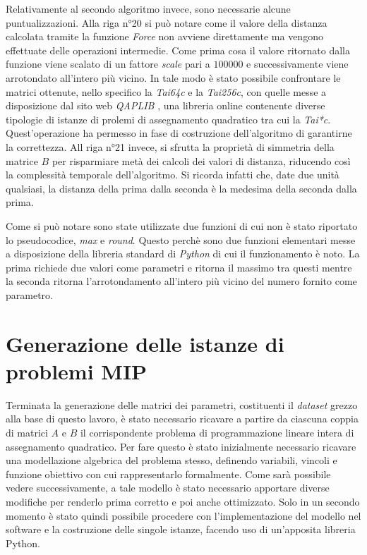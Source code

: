 Relativamente al secondo algoritmo invece, sono necessarie alcune puntualizzazioni. Alla riga n°20 si può notare come il valore della distanza 
calcolata tramite la funzione \textit{Force} non avviene direttamente ma vengono effettuate delle operazioni intermedie. Come prima cosa 
il valore ritornato dalla funzione viene scalato di un fattore \textit{scale} pari a $100000$ e successivamente viene arrotondato all'intero 
più vicino. In tale modo è stato possibile confrontare le matrici ottenute, nello specifico la \textit{Tai64c} e la \textit{Tai256c}, 
con quelle messe a disposizione dal sito web \textit{QAPLIB} \cite{QAPLIB}, una libreria online contenente diverse tipologie di istanze 
di prolemi di assegnamento quadratico tra cui la \textit{Tai*c}. Quest'operazione ha permesso in fase di costruzione dell'algoritmo di 
garantirne la correttezza. All riga n°21 invece, si sfrutta la proprietà di simmetria della matrice $B$ per risparmiare 
metà dei calcoli dei valori di distanza, riducendo così la complessità temporale dell'algoritmo. Si ricorda infatti che, date due unità 
qualsiasi, la distanza della prima dalla seconda è la medesima della seconda dalla prima.

Come si può notare sono state utilizzate due funzioni di cui non è stato riportato lo pseudocodice, \textit{max} e \textit{round}.
Questo perchè sono due funzioni elementari messe a disposizione della libreria standard di \textit{Python} \cite{python} di cui il 
funzionamento è noto. La prima richiede due valori come parametri e ritorna il massimo tra questi mentre la seconda ritorna 
l'arrotondamento all'intero più vicino del numero fornito come parametro.



\newpage
\section{Generazione delle istanze di problemi MIP}
Terminata la generazione delle matrici dei parametri, costituenti il \textit{dataset} grezzo alla base di questo lavoro, è stato necessario ricavare a 
partire da ciascuna coppia di matrici $A$ e $B$ il corrispondente problema di programmazione lineare intera di assegnamento quadratico. Per fare questo è stato 
inizialmente necessario ricavare una modellazione algebrica del problema stesso, definendo variabili, vincoli e funzione obiettivo con cui 
rappresentarlo formalmente. Come sarà possibile vedere successivamente, a tale modello è stato necessario apportare diverse modifiche per renderlo
prima corretto e poi anche ottimizzato. Solo in un secondo momento è stato quindi possibile procedere con l'implementazione del modello nel software 
e la costruzione delle singole istanze, facendo uso di un'apposita libreria Python.

